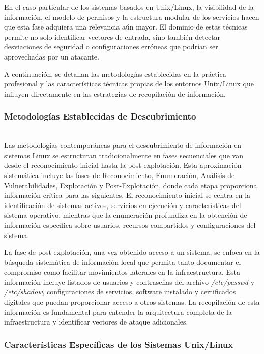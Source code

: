 \documentclass[runningheads]{llncs}
\begin{document}
En el caso particular de los sistemas basados en Unix/Linux, la visibilidad de la información, el modelo de permisos y la estructura modular de los servicios hacen que esta fase adquiera una relevancia aún mayor. El dominio de estas técnicas permite no solo identificar vectores de entrada, sino también detectar desviaciones de seguridad o configuraciones erróneas que podrían ser aprovechadas por un atacante.

A continuación, se detallan las metodologías establecidas en la práctica profesional y las características técnicas propias de los entornos Unix/Linux que influyen directamente en las estrategias de recopilación de información.

\newpage
\subsubsection{Metodologías Establecidas de Descubrimiento}
\hfill\\

Las metodologías contemporáneas para el descubrimiento de información en sistemas Linux se estructuran tradicionalmente en fases secuenciales que van desde el reconocimiento inicial hasta la post-explotación. Esta aproximación sistemática incluye las fases de Reconocimiento, Enumeración, Análisis de Vulnerabilidades, Explotación y Post-Explotación, donde cada etapa proporciona información crítica para las siguientes. El reconocimiento inicial se centra en la identificación de sistemas activos, servicios en ejecución y características del sistema operativo, mientras que la enumeración profundiza en la obtención de información específica sobre usuarios, recursos compartidos y configuraciones del sistema.

La fase de post-explotación, una vez obtenido acceso a un sistema, se enfoca en la búsqueda sistemática de información local que permita tanto documentar el compromiso como facilitar movimientos laterales en la infraestructura. Esta información incluye listados de usuarios y contraseñas del archivo \textit{/etc/passwd} y \textit{/etc/shadow}, configuraciones de servicios, software instalado y certificados digitales que puedan proporcionar acceso a otros sistemas. La recopilación de esta información es fundamental para entender la arquitectura completa de la infraestructura y identificar vectores de ataque adicionales.

\subsubsection{Características Específicas de los Sistemas Unix/Linux}
\hfill\\
\end{document}
